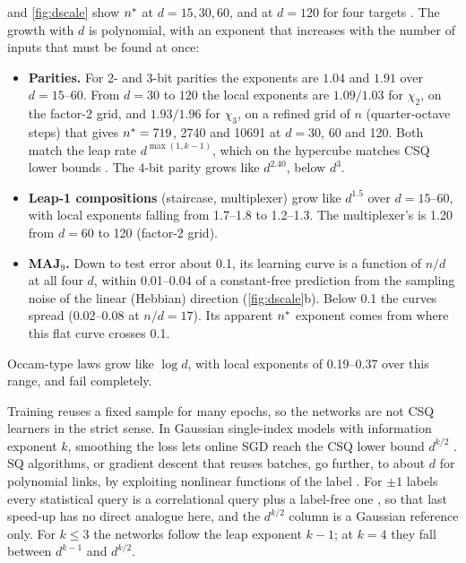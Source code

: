  and \cref{fig:dscale} show $n^{*}$ at $d=15,30,60$, and at $d=120$ for four targets . The growth with $d$ is polynomial, with an exponent that increases with the number of inputs that must be found at once:
\begin{itemize}
\item \textbf{Parities.} For 2- and 3-bit parities the exponents are $1.04$ and $1.91$ over $d=15$–$60$. From $d=30$ to $120$ the local exponents are $1.09/1.03$ for $\chi_2$, on the factor-2 grid, and $1.93/1.96$ for $\chi_3$, on a refined grid of $n$ (quarter-octave steps) that gives $n^{*}=719$, 2740 and 10691 at $d=30$, 60 and 120. Both match the leap rate $d^{\max(1,k-1)}$, which on the hypercube matches CSQ lower bounds \cite{abbe2023leap}. The 4-bit parity grows like $d^{2.40}$, below $d^{3}$.
\item \textbf{Leap-1 compositions} (staircase, multiplexer) grow like $d^{1.5}$ over $d=15$–60, with local exponents falling from 1.7–1.8 to 1.2–1.3. The multiplexer's is 1.20 from $d=60$ to 120 (factor-2 grid).
\item \textbf{MAJ$_9$.} Down to test error about 0.1, its learning curve is a function of $n/d$ at all four $d$, within 0.01–0.04 of a constant-free prediction from the sampling noise of the linear (Hebbian) direction (\cref{fig:dscale}b). Below 0.1 the curves spread (0.02–0.08 at $n/d=17$). Its apparent $n^{*}$ exponent comes from where this flat curve crosses 0.1.
\end{itemize}
Occam-type laws grow like $\log d$, with local exponents of 0.19–0.37 over this range, and fail completely.

Training reuses a fixed sample for many epochs, so the networks are not CSQ learners in the strict sense. In Gaussian single-index models with information exponent $k$, smoothing the loss lets online SGD reach the CSQ lower bound $d^{k/2}$ \cite{damian2023smoothing}. SQ algorithms, or gradient descent that reuses batches, go further, to about $d$ for polynomial links, by exploiting nonlinear functions of the label \cite{damian2024gaps,dandi2024reuse}. For $\pm1$ labels every statistical query is a correlational query plus a label-free one \cite{bshouty2002sq}, so that last speed-up has no direct analogue here, and the $d^{k/2}$ column is a Gaussian reference only. For $k\le3$ the networks follow the leap exponent $k-1$; at $k=4$ they fall between $d^{k-1}$ and $d^{k/2}$.

